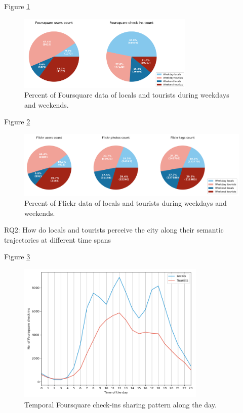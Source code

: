 \documentclass{article}
\begin{document}
Figure \ref{fig:foursquare_week_count_pie}
\begin{figure}
\centering
\includegraphics[width=0.75\textwidth]{figures/foursquare_week_count_pie.png}
\caption{\label{fig:foursquare_week_count_pie}Percent of Foursquare data of locals and tourists during weekdays and weekends.}
\end{figure}

Figure \ref{fig:flickr_week_count_pie}
\begin{figure}
\centering
\includegraphics[width=1.13\textwidth]{figures/flickr_week_count_pie.png}
\caption{\label{fig:flickr_week_count_pie}Percent of Flickr data of locals and tourists during weekdays and weekends.}
\end{figure}


RQ2: How do locals and tourists perceive the city along their semantic trajectories at different time spans

Figure \ref{fig:foursquare_trend_day}
\begin{figure}
\centering
\includegraphics[width=0.8\textwidth]{figures/foursquare_trend_day.png}
\caption{\label{fig:foursquare_trend_day}Temporal Foursquare check-ins sharing pattern along the day.}
\end{figure}
\end{document}
